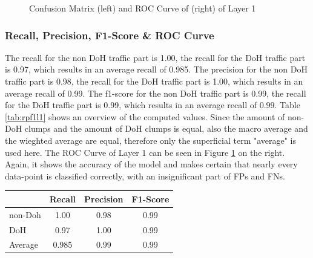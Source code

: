 \begin{figure}[ht]
\centering
{}\hspace{1.0cm}
\caption{Confusion Matrix (left) and ROC Curve of (right) of Layer 1}
\label{fig:con_roc_l1}
\end{figure}

\subsubsection{Recall, Precision, F1-Score \& ROC Curve}
The recall for the non DoH traffic part is 1.00, the recall for the DoH traffic part is 0.97, which results in an average recall of 0.985. The precision for the non DoH traffic part is 0.98, the recall for the DoH traffic part is 1.00, which results in an average recall of 0.99. The f1-score for the non DoH traffic part is 0.99, the recall for the DoH traffic part is 0.99, which results in an average recall of 0.99. Table \ref{tab:rpf1l1} shows an overview of the computed values. Since the amount of non-DoH clumps and the amount of DoH clumps is equal, also the macro average and the wieghted average are equal, therefore only the superficial term "average" is used here. The ROC Curve of Layer 1 can be seen in Figure \ref{fig:con_roc_l1} on the right. Again, it shows the accuracy of the model and makes certain that nearly every data-point is classified correctly, with an insignificant part of FPs and FNs.

\begin{center}
\begin{longtable}{ |l|c|c|c| }
\hline
 & Recall & Precision & F1-Score \\
\hline
non-Doh & 1.00 & 0.98 & 0.99 \\
\hline
DoH & 0.97 & 1.00 & 0.99 \\
\hline
Average & 0.985 & 0.99 & 0.99 \\ 
\hline
\end{longtable}
\label{tab:rpf1l1}
\end{center}

